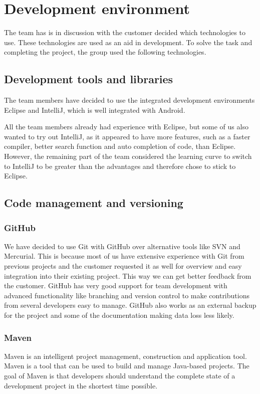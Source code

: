 \chapter{Development environment}

The team has is in discussion with the customer decided which technologies to use. These technologies are used as an aid in development. To solve the task and completing the project, the group used the following technologies.

\section{Development tools and libraries}

The team members have decided to use the  integrated development environments Eclipse and IntelliJ, which is well integrated with Android. 

All the team members already had experience with Eclipse, but some of us also wanted to try out IntelliJ, as it appeared to have more features, such as a faster compiler, better search function and auto completion of code, than Eclipse. However, the remaining part of the team considered the learning curve to switch to IntelliJ to be greater than the advantages and therefore chose to stick to Eclipse.

\section{Code management and versioning}
\subsection{GitHub}
We have decided to use Git with GitHub over alternative tools like SVN and Mercurial. This is because most of us have extensive experience with Git from previous projects and the customer requested it as well for overview and easy integration into their existing project. This way we can get better feedback from the customer. GitHub has very good support for team development with advanced functionality like branching and version control to make contributions from several developers easy to manage. GitHub also works as an external backup for the project and some of the documentation making data loss less likely.

\subsection{Maven}
Maven is an intelligent project management, construction and application tool. Maven is a tool that can be used to build and manage Java-based projects. The goal of Maven is that developers should understand the complete state of a development project in the shortest time possible.

